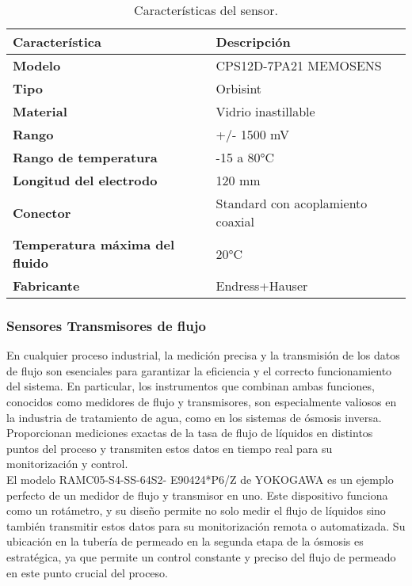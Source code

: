 \begin{table}[H]
    \centering
    \caption{Características del sensor.}
    \label{table:sensor_5}
    \begin{tabular}{| L{5cm} | L{5cm} |}
        \hline
        \textbf{Característica} & \textbf{Descripción}  \\
        \hline
        \textbf{Modelo} & CPS12D-7PA21 MEMOSENS  \\
        \hline
        \textbf{Tipo} & Orbisint  \\
        \hline
        \textbf{Material} & Vidrio inastillable  \\
        \hline
        \textbf{Rango} & +/- 1500 mV  \\
        \hline
        \textbf{Rango de temperatura} & -15 a 80°C  \\
        \hline
        \textbf{Longitud del electrodo} & 120 mm  \\
        \hline
        \textbf{Conector} & Standard con acoplamiento coaxial  \\
        \hline
        \textbf{Temperatura máxima del fluido} & 20°C  \\
        \hline
        \textbf{Fabricante} & Endress+Hauser  \\
        \hline
    \end{tabular}
\end{table}


\subsubsection{Sensores Transmisores de flujo}

En cualquier proceso industrial, la medición precisa y la transmisión de los datos de flujo son esenciales para garantizar la eficiencia y el correcto funcionamiento del sistema. En particular, los instrumentos que combinan ambas funciones, conocidos como medidores de flujo y transmisores, son especialmente valiosos en la industria de tratamiento de agua, como en los sistemas de ósmosis inversa. Proporcionan mediciones exactas de la tasa de flujo de líquidos en distintos puntos del proceso y transmiten estos datos en tiempo real para su monitorización y control.\\

El modelo RAMC05-S4-SS-64S2- E90424*P6/Z de YOKOGAWA es un ejemplo perfecto de un medidor de flujo y transmisor en uno. Este dispositivo funciona como un rotámetro, y su diseño permite no solo medir el flujo de líquidos sino también transmitir estos datos para su monitorización remota o automatizada. Su ubicación en la tubería de permeado en la segunda etapa de la ósmosis es estratégica, ya que permite un control constante y preciso del flujo de permeado en este punto crucial del proceso.\\

